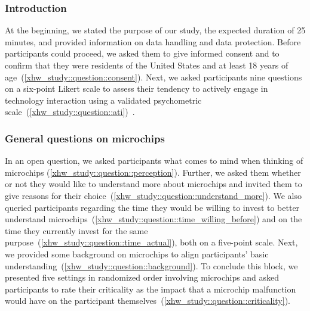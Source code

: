 \subsubsection{Introduction}
At the beginning, we stated the purpose of our study, the expected duration of 25 minutes, and provided information on data handling and data protection.
Before participants could proceed, we asked them to give informed consent and to confirm that they were residents of the United States and at least 18 years of age~(\autoref{xhw_study::question::consent}).
Next, we asked participants nine questions on a six-point Likert scale to assess their tendency to actively engage in technology interaction using a validated psychometric scale~(\autoref{xhw_study::question::ati})~\cite{franke2019personal}.


\subsubsection{General questions on microchips}
In an open question, we asked participants what comes to mind when thinking of microchips (\autoref{xhw_study::question::perception}).
Further, we asked them whether or not they would like to understand more about microchips and invited them to give reasons for their choice~(\autoref{xhw_study::question::understand_more}).
We also queried participants regarding the time they would be willing to invest to better understand microchips~(\autoref{xhw_study::question::time_willing_before}) and on the time they currently invest for the same purpose~(\autoref{xhw_study::question::time_actual}), both on a five-point scale.
Next, we provided some background on microchips to align participants' basic understanding~(\autoref{xhw_study::question::background}).
To conclude this block, we presented five settings in randomized order involving microchips and asked participants to rate their criticality as the impact that a microchip malfunction would have on the participant themselves~(\autoref{xhw_study::question::criticality}).

